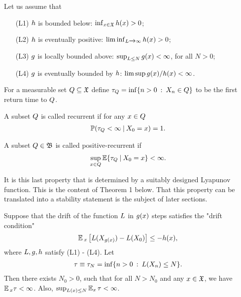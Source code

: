 	Let us assume that
	\begin{enumerate}
		\item[(L1)] $h$ is bounded below: $\inf_{x \in \mathfrak{X}}h(x) > 0$;
		\item[(L2)] $h$ is eventually positive: $\liminf_{L \xrightarrow{} \infty}h(x) > 0$;
		\item[(L3)] $g$ is locally bounded above: $\sup_{L \leq N}g(x) < \infty$, for all $N > 0$;
		\item[(L4)] $g$ is eventually bounded by $h$: $\limsup g(x)/h(x) < \infty$.
	\end{enumerate}
	For a measurable set $Q \subseteq \mathfrak{X}$ define $\tau_{Q} = \inf\{n > 0 \: : \: X_{n} \in Q\}$ to be the first return time to $Q$. 
	\begin{definition}
		A subset $Q$ is called recurrent if for any $x \in Q$
		\begin{gather*}
		\operatorname*{\mathbb{P}}(\tau_{Q} < \infty \: | \: X_{0} = x) = 1.
		\end{gather*}
	\end{definition}
	\begin{definition}
		A subset $Q \in \mathfrak{B}$ is called positive-recurrent if
		\begin{gather}
		\sup_{x \in Q}\operatorname*{\mathbb{E}}\{\tau_{Q} \: | \: X_{0} = x\} < \infty.
		\end{gather}
	\end{definition}
	It is this last property that is determined by a suitably designed Lyapunov function. This is the content of Theorem 1 below. That this property can be translated into a stability statement is the subject of later sections.
	\begin{theorem*}
		Suppose that the drift of the function $L$ in $g(x)$ steps satisfies the "drift condition"
		\begin{gather*}
		\operatorname*{\mathbb{E}}{}_{x}\left[L(X_{g(x)}) - L(X_{0})\right] \leq -h(x),
		\end{gather*}
		where $L, g, h$ satisfy (L1) - (L4). Let
		\begin{gather*}
		\tau \equiv \tau_{N} = \inf\{n > 0 \: :  \: L(X_{n}) \leq N\}.
		\end{gather*}
		Then there exists $N_{0} > 0$, such that for all $N > N_{0}$ and any $x \in \mathfrak{X}$, we have $\operatorname*{\mathbb{E}}{}_{x}\tau < \infty$. Also, $\sup_{L(x) \leq N}\operatorname*{\mathbb{E}}_{x}\tau < \infty$.
	\end{theorem*}
